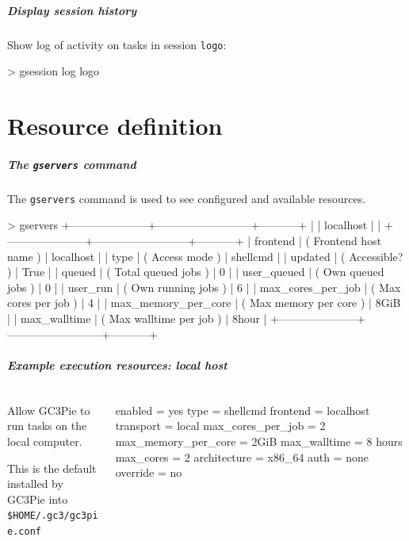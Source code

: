 \documentclass[english,serif,mathserif,usenames,dvipsnames]{beamer}
\begin{document}
\begin{frame}
  \frametitle{Display session history}

  Show log of activity on tasks in session \texttt{logo}:
\begin{semiverbatim}
    > gsession log logo
\end{semiverbatim}
\end{frame}


\part{Resource definition}
\begin{frame}[fragile]
  \frametitle{The \texttt{gservers} command}

  The \texttt{gservers} command is used to see \alert<2>{configured} and
  available resources.

\+
\begin{stdout}
> gservers
+---------------------+--------------------------+-----------+
|                     | localhost                |           |
+---------------------+--------------------------+-----------+
|            frontend | ( Frontend host name )   | localhost |
|                type | ( Access mode )          | shellcmd  |
|             updated | ( Accessible? )          | True      |
|              queued | ( Total queued jobs )    | 0         |
|         user_queued | ( Own queued jobs )      | 0         |
|            user_run | ( Own running jobs )     | 6         |
|   max_cores_per_job | ( Max cores per job )    | 4         |
| max_memory_per_core | ( Max memory per core )  | 8GiB      |
|        max_walltime | ( Max walltime per job ) | 8hour     |
+---------------------+--------------------------+-----------+
\end{stdout}

\end{frame}


\begin{frame}[fragile,label=resources]
  \frametitle{Example execution resources: local host}
  \begin{columns}[t]
    \begin{column}{0.5\textwidth}
      Allow GC3Pie to run tasks on the local computer.

      \+ This is the default installed by GC3Pie
      into \lstinline|$HOME/.gc3/gc3pie.conf| %
    \end{column}
    \begin{column}{0.5\textwidth}
  \begin{stdout}
enabled = yes
type = shellcmd
frontend = localhost
transport = local
max_cores_per_job = 2
max_memory_per_core = 2GiB
max_walltime = 8 hours
max_cores = 2
architecture = x86_64
auth = none
override = no
\end{stdout}
    \end{column}
  \end{columns}
\end{frame}
\end{document}
